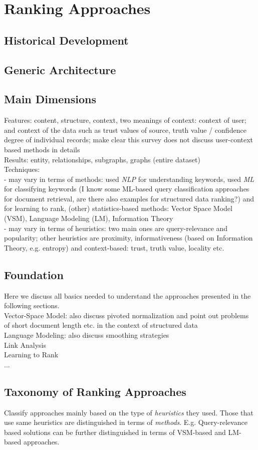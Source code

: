 \section{Ranking Approaches}

\subsection{Historical Development} 


\subsection{Generic Architecture} 


\subsection{Main Dimensions} 
Features: content, structure, context, two meanings of context: context of user; and context of the data such as trust values of source, truth value / confidence degree of individual records; make clear this survey does not discuss user-context based methods in details\\
Results: entity, relationships, subgraphs, graphs (entire dataset)\\
Techniques:\\
- may vary in terms of methods: used \emph{NLP} for understanding keywords, used \emph{ML} for classifying keywords (I know some ML-based query classification approaches for document retrieval, are there also examples for structured data ranking?) and for learning to rank, (other) statistics-based methods: Vector Space Model (VSM), Language Modeling (LM), Information Theory\\
- may vary in terms of heuristics: two main ones are query-relevance and popularity; other heuristics are proximity, informativeness (based on Information Theory, e.g. entropy) and context-based: trust, truth value, locality etc. 


\subsection{Foundation}
Here we discuss all basics needed to understand the approaches presented in the following sections.\\
Vector-Space Model: also discuss pivoted normalization and point out problems of short document length etc. in the context of structured data\\
Language Modeling: also discuss smoothing strategies\\
Link Analysis\\
Learning to Rank\\
... 

\subsection{Taxonomy of Ranking Approaches}
Classify approaches mainly based on the type of \emph{heuristics} they used. Those that use same heuristics are distinguished in terms of \emph{methods}. E.g. Query-relevance based solutions can be further distinguished in terms of VSM-based and LM-based approaches.\\

 
